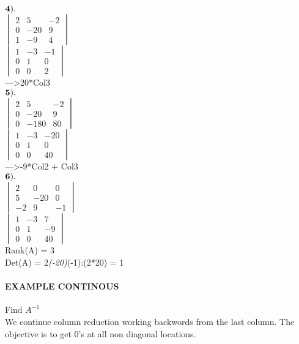 \documentclass[]{article}
\let\oldparagraph\paragraph
\renewcommand{\paragraph}[1]{\oldparagraph{#1}\mbox{}}
\begin{document}
\(\bold{4).}\)\\

\(\begin{vmatrix} 2 & 5 & -2\\ 0 & -20 & 9 \\ 1 & -9 & 4 \end{vmatrix}\)\\

\(\begin{vmatrix} 1 & -3 & -1\\ 0 & 1 & 0 \\ 0 & 0 & 2 \end{vmatrix}\)\\

---\textgreater{}20*Col3\\

\(\bold{5).}\)\\

\(\begin{vmatrix} 2 & 5 & -2\\ 0 & -20 & 9 \\ 0 & -180 & 80 \end{vmatrix}\)\\

\(\begin{vmatrix} 1 & -3 & -20\\ 0 & 1 & 0 \\ 0 & 0 & 40 \end{vmatrix}\)\\

---\textgreater{}-9*Col2 + Col3\\

\(\bold{6).}\)\\

\(\begin{vmatrix} 2 & 0 & 0\\ 5 & -20 & 0\\ -2 & 9 & -1 \end{vmatrix}\)\\

\(\begin{vmatrix} 1 & -3 & 7\\ 0 & 1 & -9 \\ 0 & 0 & 40 \end{vmatrix}\)\\

Rank(A) = 3\\
 Det(A) = 2\emph{(-20)}(-1):(2*20) = 1\\

\paragraph{\texorpdfstring{EXAMPLE CONTINOUS\\
}{EXAMPLE CONTINOUS }}\label{example-continous}

Find \(A^{-1}\)\\
 We continue column reduction working backwords from the last column.
The objective is to get 0's at all non diagonal locations.\\
\end{document}
